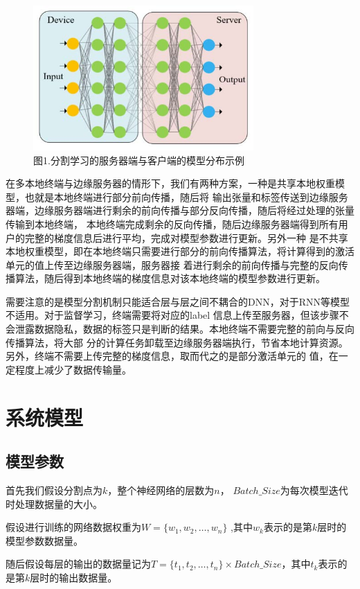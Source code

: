 \documentclass{article}
\begin{document}
\begin{figure}[H]
    \centering
    \includegraphics[width=0.75\textwidth]{./figure/0.jpg}  
    \caption*{图1.分割学习的服务器端与客户端的模型分布示例}
\end{figure}

在多本地终端与边缘服务器的情形下，我们有两种⽅案，⼀种是共享本地权重模型，也就是本地终端进⾏部分前向传播，随后将
输出张量和标签传送到边缘服务器端，边缘服务器端进⾏剩余的前向传播与部分反向传播，随后将经过处理的张量传输到本地终端，
本地终端完成剩余的反向传播，随后边缘服务器端得到所有⽤户的完整的梯度信息后进⾏平均，完成对模型参数进⾏更新。另外⼀种
是不共享本地权重模型，即在本地终端只需要进⾏部分的前向传播算法，将计算得到的激活单元的值上传⾄边缘服务器端，服务器接
着进⾏剩余的前向传播与完整的反向传播算法，随后得到本地终端的梯度信息对该本地终端的模型参数进⾏更新。

需要注意的是模型分割机制只能适合层与层之间不耦合的DNN，对于RNN等模型不适⽤。对于监督学习，终端需要将对应的label
信息上传⾄服务器，但该步骤不会泄露数据隐私，数据的标签只是判断的结果。本地终端不需要完整的前向与反向传播算法，将⼤部
分的计算任务卸载⾄边缘服务器端执⾏，节省本地计算资源。另外，终端不需要上传完整的梯度信息，取⽽代之的是部分激活单元的
值，在⼀定程度上减少了数据传输量。

\section{系统模型}
\subsection{模型参数}
⾸先我们假设分割点为$k$，整个神经⽹络的层数为$n$， $Batch\_Size$为每次模型迭代时处理数据量的⼤⼩。

假设进⾏训练的⽹络数据权重为$W=\{w_1,w_2,\dots,w_n\}$ ,其中$w_k$表示的是第$k$层时的模型参数数据量。

随后假设每层的输出的数据量记为$T=\{t_1,t_2,\dots,t_n\}\times Batch\_Size$，其中$t_k$表示的是第$k$层时的输出数据量。
\end{document}

